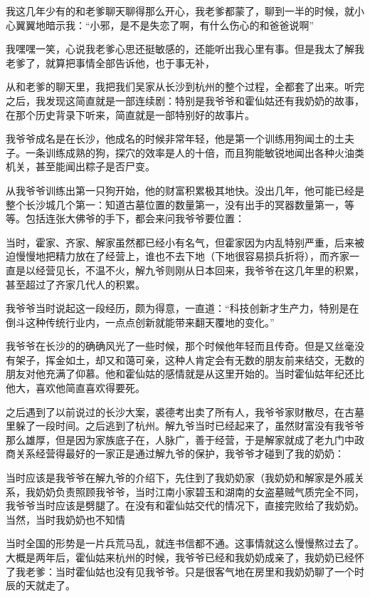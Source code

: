 我这几年少有的和老爹聊天聊得那么开心，我老爹都蒙了，聊到一半的时候，就小心翼翼地暗示我：“小邪，是不是失恋了啊，有什么伤心的和爸爸说啊”

我嘿嘿一笑，心说我老爹心思还挺敏感的，还能听出我心里有事。但是我太了解我老爹了，就算把事情全部告诉他，也于事无补，

从和老爹的聊天里，我把我们吴家从长沙到杭州的整个过程，全都套了出来。听完之后，我发现这简直就是一部连续剧：特别是我爷爷和霍仙姑还有我奶奶的故事，在那个历史背录下听来，简直就是一部特别好的故事片。

我爷爷成名是在长沙，他成名的时候非常年轻，他是第一个训练用狗闻土的土夫子。一条训练成熟的狗，探穴的效率是人的十倍，而且狗能敏锐地闻出各种火油类机关，甚至能闻出粽子是否尸变。

从我爷爷训练出第一只狗开始，他的财富积累极其地快。没出几年，他可能已经是整个长沙城几个第一：知道古墓位置的数量第一，没有出手的冥器数量第一，等等。包括连张大佛爷的手下，都会来问我爷爷要位置：

当时，霍家、齐家、解家虽然都已经小有名气，但霍家因为内乱特别严重，后来被迫慢慢地把精力放在了经营上，谁也不去下地（下地很容易损兵折将），而齐家一直是以经营见长，不温不火，解九爷则刚从日本回来，我爷爷在这几年里的积累，甚至超过了齐家几代人的积累。

我爷爷当时说起这一段经历，颇为得意，一直道：“科技创新才生产力，特别是在倒斗这种传统行业内，一点点创新就能带来翻天覆地的变化。”

我爷爷在长沙的的确确风光了一些时候，那个时候他年轻而且传奇。但是又丝毫没有架子，挥金如土，却又和蔼可亲，这种人肯定会有无数的朋友前来结交，无数的朋友对他充满了仰慕。他和霍仙姑的感情就是从这里开始的。当时霍仙姑年纪还比他大，喜欢他简直喜欢得要死。

之后遇到了以前说过的长沙大案，裘德考出卖了所有人，我爷爷家财散尽，在古墓里躲了一段时间。之后逃到了杭州。解九爷当时已经起来了，虽然财富没有我爷爷那么雄厚，但是因为家族底子在，人脉广，善于经营，于是解家就成了老九门中政商关系经营得最好的一家正是通过解九爷的保护，我爷爷才碰到了我的奶奶：

当时应该是我爷爷在解九爷的介绍下，先住到了我奶奶家（我奶奶和解家是外戚关系，我奶奶负责照顾我爷爷，当时江南小家碧玉和湖南的女盗墓贼气质完全不同，我爷爷当时应该是劈腿了。在没有和霍仙姑交代的情况下，直接完败给了我奶奶。当然，当时我奶奶也不知情

当时全国的形势是一片兵荒马乱，就连书信都不通。这事情就这么慢慢熬过去了。大概是两年后，霍仙姑来杭州的时候，我爷爷已经和我奶奶成亲了，我奶奶已经怀了我老爹：当时霍仙姑也没有见我爷爷。只是很客气地在房里和我奶奶聊了一个时辰的天就走了。

